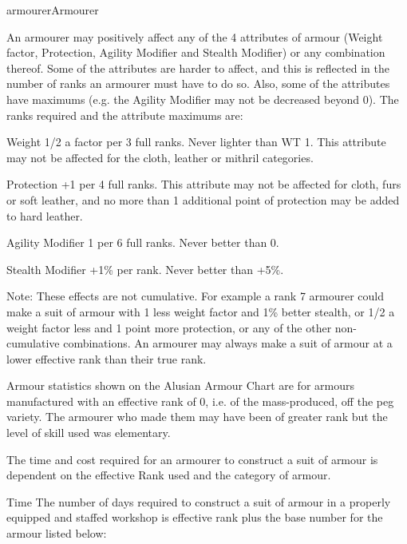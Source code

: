 \begin{Skill}[1.3]{armourer}{Armourer}

An armourer may positively affect any of the 4 attributes of armour
(Weight factor, Protection, Agility Modifier and Stealth Modifier) or
any combination thereof.  Some of the attributes are harder to affect,
and this is reflected in the number of ranks an armourer must have to
do so.  Also, some of the attributes have maximums (e.g.  the Agility
Modifier may not be decreased beyond 0).  The ranks required and the
attribute maximums are:

\begin{Description}
\item[Weight] 1/2 a factor per 3 full ranks. Never lighter than WT 1.
  This attribute may not be affected for the cloth, leather or mithril
  categories.

\item[Protection] +1 per 4 full ranks.  This attribute may not be
  affected for cloth, furs or soft leather, and no more than 1
  additional point of protection may be added to hard leather.

\item[Agility Modifier] 1 per 6 full ranks.  Never better than 0.

\item[Stealth Modifier] +1\% per rank. Never better than +5\%.

\end{Description}

Note: These effects are not cumulative. For example a rank 7 armourer
could make a suit of armour with 1 less weight factor and 1\% better
stealth, or 1/2 a weight factor less and 1 point more protection, or
any of the other non-cumulative combinations.  An armourer may always
make a suit of armour at a lower effective rank than their true rank.

Armour statistics shown on the Alusian Armour Chart are for armours
manufactured with an effective rank of 0, i.e.  of the
mass-produced, off the peg variety.  The armourer who made them may
have been of greater rank but the level of skill used was elementary.

The time and cost required for an armourer to construct a suit of
armour is dependent on the effective Rank used and the category of
armour.

Time The number of days required to construct a suit of armour in a
properly equipped and staffed workshop is effective rank plus the base
number for the armour listed below:


\end{Skill}
